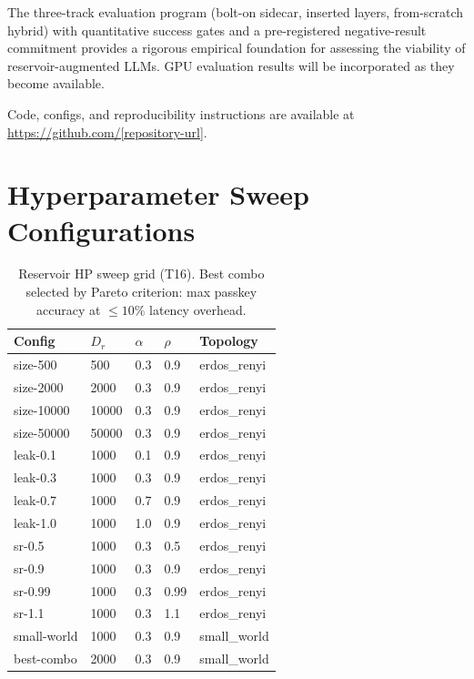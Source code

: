 \documentclass[11pt,a4paper]{article}
\theoremstyle{definition}
\begin{document}
The three-track evaluation program (bolt-on sidecar, inserted layers,
from-scratch hybrid) with quantitative success gates and a pre-registered
negative-result commitment provides a rigorous empirical foundation for
assessing the viability of reservoir-augmented LLMs.  GPU evaluation results
will be incorporated as they become available.

Code, configs, and reproducibility instructions are available at
\url{https://github.com/[repository-url]}.




\appendix

\section{Hyperparameter Sweep Configurations}
\label{app:sweep}

\begin{table}[h]
\centering
\caption{Reservoir HP sweep grid (T16). Best combo selected by Pareto
  criterion: max passkey accuracy at $\leq 10\%$ latency overhead.}
\label{tab:sweep_configs}
\begin{tabular}{@{}lllll@{}}
\toprule
Config & $D_r$ & $\alpha$ & $\rho$ & Topology \\
\midrule
size-500 & 500 & 0.3 & 0.9 & erdos\_renyi \\
size-2000 & 2000 & 0.3 & 0.9 & erdos\_renyi \\
size-10000 & 10000 & 0.3 & 0.9 & erdos\_renyi \\
size-50000 & 50000 & 0.3 & 0.9 & erdos\_renyi \\
leak-0.1 & 1000 & 0.1 & 0.9 & erdos\_renyi \\
leak-0.3 & 1000 & 0.3 & 0.9 & erdos\_renyi \\
leak-0.7 & 1000 & 0.7 & 0.9 & erdos\_renyi \\
leak-1.0 & 1000 & 1.0 & 0.9 & erdos\_renyi \\
sr-0.5 & 1000 & 0.3 & 0.5 & erdos\_renyi \\
sr-0.9 & 1000 & 0.3 & 0.9 & erdos\_renyi \\
sr-0.99 & 1000 & 0.3 & 0.99 & erdos\_renyi \\
sr-1.1 & 1000 & 0.3 & 1.1 & erdos\_renyi \\
small-world & 1000 & 0.3 & 0.9 & small\_world \\
best-combo & 2000 & 0.3 & 0.9 & small\_world \\
\bottomrule
\end{tabular}
\end{table}
\end{document}

